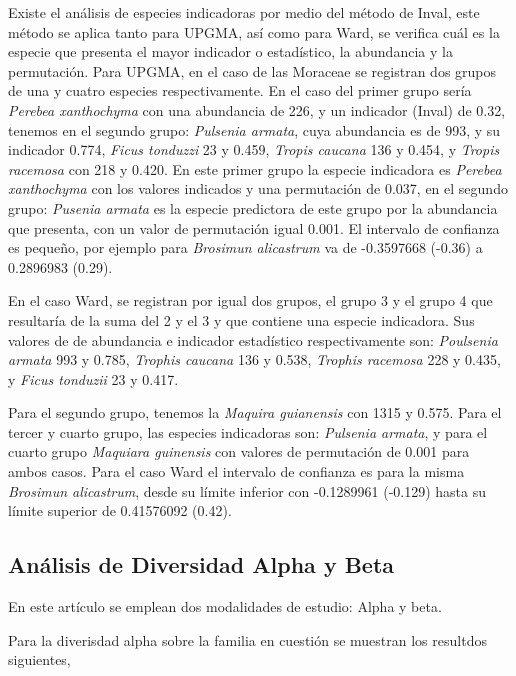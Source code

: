 \documentclass[11pt,]{article}
\begin{document}
Existe el análisis de especies indicadoras por medio del método de
Inval, este método se aplica tanto para UPGMA, así como para Ward, se
verifica cuál es la especie que presenta el mayor indicador o
estadístico, la abundancia y la permutación. Para UPGMA, en el caso de
las Moraceae se registran dos grupos de una y cuatro especies
respectivamente. En el caso del primer grupo sería \emph{Perebea
xanthochyma} con una abundancia de 226, y un indicador (Inval) de 0.32,
tenemos en el segundo grupo: \emph{Pulsenia armata}, cuya abundancia es
de 993, y su indicador 0.774, \emph{Ficus tonduzzi} 23 y 0.459,
\emph{Tropis caucana} 136 y 0.454, y \emph{Tropis racemosa} con 218 y
0.420. En este primer grupo la especie indicadora es \emph{Perebea
xanthochyma} con los valores indicados y una permutación de 0.037, en el
segundo grupo: \emph{Pusenia armata} es la especie predictora de este
grupo por la abundancia que presenta, con un valor de permutación igual
0.001. El intervalo de confianza es pequeño, por ejemplo para
\emph{Brosimun alicastrum} va de -0.3597668 (-0.36) a 0.2896983 (0.29).

En el caso Ward, se registran por igual dos grupos, el grupo 3 y el
grupo 4 que resultaría de la suma del 2 y el 3 y que contiene una
especie indicadora. Sus valores de de abundancia e indicador estadístico
respectivamente son: \emph{Poulsenia armata} 993 y 0.785, \emph{Trophis
caucana} 136 y 0.538, \emph{Trophis racemosa} 228 y 0.435, y \emph{Ficus
tonduzii} 23 y 0.417.

Para el segundo grupo, tenemos la \emph{Maquira guianensis} con 1315 y
0.575. Para el tercer y cuarto grupo, las especies indicadoras son:
\emph{Pulsenia armata}, y para el cuarto grupo \emph{Maquiara guinensis}
con valores de permutación de 0.001 para ambos casos. Para el caso Ward
el intervalo de confianza es para la misma \emph{Brosimun alicastrum},
desde su límite inferior con -0.1289961 (-0.129) hasta su límite
superior de 0.41576092 (0.42).

\subsection{Análisis de Diversidad Alpha y
Beta}\label{anuxe1lisis-de-diversidad-alpha-y-beta}

En este artículo se emplean dos modalidades de estudio: Alpha y beta.

Para la diverisdad alpha sobre la familia en cuestión se muestran los
resultdos siguientes,
\end{document}
